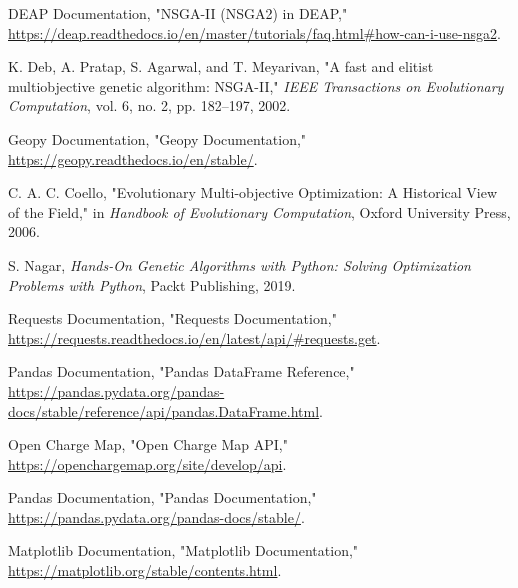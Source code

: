 \documentclass[12pt]{report}
\begin{document}
\begin{thebibliography}{99}
     DEAP Documentation, "NSGA-II (NSGA2) in DEAP," \url{https://deap.readthedocs.io/en/master/tutorials/faq.html\#how-can-i-use-nsga2}.
    
     K. Deb, A. Pratap, S. Agarwal, and T. Meyarivan, "A fast and elitist multiobjective genetic algorithm: NSGA-II," \textit{IEEE Transactions on Evolutionary Computation}, vol. 6, no. 2, pp. 182–197, 2002.
    
     Geopy Documentation, "Geopy Documentation," \url{https://geopy.readthedocs.io/en/stable/}.
    
     C. A. C. Coello, "Evolutionary Multi-objective Optimization: A Historical View of the Field," in \textit{Handbook of Evolutionary Computation}, Oxford University Press, 2006.
    
     S. Nagar, \textit{Hands-On Genetic Algorithms with Python: Solving Optimization Problems with Python}, Packt Publishing, 2019.

     Requests Documentation, "Requests Documentation,"  \url{https://requests.readthedocs.io/en/latest/api/\#requests.get}.
    
     Pandas Documentation, "Pandas DataFrame Reference," \url{https://pandas.pydata.org/pandas-docs/stable/reference/api/pandas.DataFrame.html}.



    
     Open Charge Map, "Open Charge Map API," \url{https://openchargemap.org/site/develop/api}.
    


     Pandas Documentation, "Pandas Documentation," \url{https://pandas.pydata.org/pandas-docs/stable/}.
    
    Matplotlib Documentation, "Matplotlib Documentation," \url{https://matplotlib.org/stable/contents.html}.
    

       

\end{thebibliography}
\end{document}
